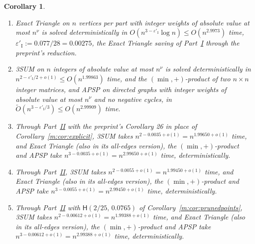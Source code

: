 \documentclass[11pt]{article}
\newtheorem{corollary}[theorem]{Corollary}
\theoremstyle{definition}
\theoremstyle{remark}
\newcommand{\Hyp}{\mathsf{H}}
\newcommand{\EpsGammaBest}{0.00612}%
\newcommand{\ExpThreeSumBest}{1.99388}%
\newcommand{\HypPrunedEps}{2/25}%
\newcommand{\HypPrunedGamma}{0.0765}%
\newcommand{\ExpAPSPBest}{2.99388}%
\begin{document}
\begin{corollary}\label{x:cor:fg}
\begin{enumerate}[label=(\alph*),nosep]
\item Exact Triangle on $n$ vertices per part with integer weights of absolute value at most $n^\nu$ is solved deterministically in $O(n^{3-\varepsilon'_{\mathrm I}}\log n)\le O(n^{2.9973})$ time, $\varepsilon'_{\mathrm I}:=0.077/28=0.00275$, the Exact Triangle saving of Part~\hyperref[m:partI]{I} through the preprint's reduction.
\item 3SUM on $n$ integers of absolute value at most $n^\nu$ is solved deterministically in $n^{2-\varepsilon'_{\mathrm I}/2+o(1)}\le O(n^{1.99863})$ time, and the $(\min,+)$-product of two $n\times n$ integer matrices, and APSP on directed graphs with integer weights of absolute value at most $n^\nu$ and no negative cycles, in $\tilde O(n^{3-\varepsilon'_{\mathrm I}/3})\le O(n^{2.99909})$ time.
\item Through Part~\hyperref[m:partII]{II} with the preprint's Corollary 26 in place of Corollary~\ref{m:cor:explicit}, 3SUM takes $n^{2-0.0035+o(1)}=n^{1.99650+o(1)}$ time, and Exact Triangle (also in its all-edges version), the $(\min,+)$-product and APSP take $n^{3-0.0035+o(1)}=n^{2.99650+o(1)}$ time, deterministically.
\item Through Part~\hyperref[m:partII]{II}, 3SUM takes $n^{2-0.0055+o(1)}=n^{1.99450+o(1)}$ time, and Exact Triangle (also in its all-edges version), the $(\min,+)$-product and APSP take $n^{3-0.0055+o(1)}=n^{2.99450+o(1)}$ time, deterministically.
\item Through Part~\hyperref[m:partII]{II} with $\Hyp(\HypPrunedEps,\,\HypPrunedGamma)$ of Corollary~\ref{m:cor:prunedpoints}, 3SUM takes $n^{2-\EpsGammaBest+o(1)}=n^{\ExpThreeSumBest+o(1)}$ time, and Exact Triangle (also in its all-edges version), the $(\min,+)$-product and APSP take $n^{3-\EpsGammaBest+o(1)}=n^{\ExpAPSPBest+o(1)}$ time, deterministically.
\end{enumerate}
\end{corollary}
\end{document}
